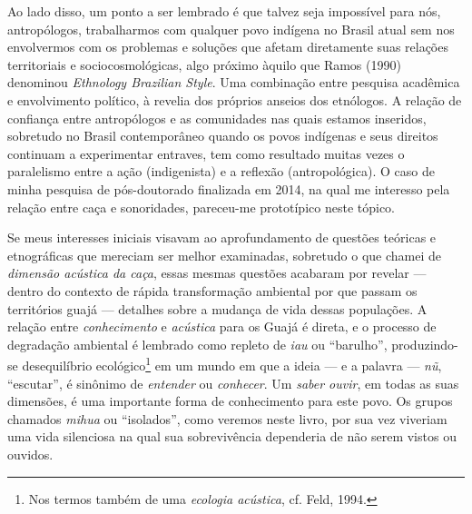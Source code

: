 Ao lado disso, um ponto a ser lembrado é que talvez seja impossível para
nós, antropólogos, trabalharmos com qualquer povo indígena no Brasil
atual sem nos envolvermos com os problemas e soluções que afetam
diretamente suas relações territoriais e sociocosmológicas, algo próximo
àquilo que Ramos (1990) denominou \textit{Ethnology Brazilian Style}.
Uma combinação entre pesquisa acadêmica e envolvimento político, à
revelia dos próprios anseios dos etnólogos. A relação de confiança entre
antropólogos e as comunidades nas quais estamos inseridos, sobretudo no
Brasil contemporâneo quando os povos indígenas e seus direitos continuam
a experimentar entraves, tem como resultado muitas vezes o paralelismo
entre a ação (indigenista) e a reflexão (antropológica). O caso de minha
pesquisa de pós-doutorado finalizada em 2014, na qual me interesso pela
relação entre caça e sonoridades, pareceu-me prototípico neste tópico.

Se meus interesses iniciais visavam ao aprofundamento de questões
teóricas e etnográficas que mereciam ser melhor examinadas, sobretudo
o que chamei de \textit{dimensão acústica da caça}, essas mesmas questões
acabaram por revelar --- dentro do contexto de rápida transformação
ambiental por que passam os territórios guajá --- detalhes sobre a
mudança de vida dessas populações. A relação entre \textit{conhecimento} e
\textit{acústica} para os Guajá é direta, e o processo de degradação ambiental
é lembrado como repleto de \textit{iau} ou ``barulho'', produzindo-se
desequilíbrio ecológico\footnote{Nos termos também de uma \textit{ecologia acústica},
cf. Feld, 1994.} em um mundo em que a ideia --- e a palavra --- \textit{nũ}, ``escutar'', é sinônimo de \textit{entender} ou \textit{conhecer}. Um \textit{saber
ouvir}, em todas as suas dimensões, é uma importante forma de
conhecimento para este povo. Os grupos chamados \textit{mihua} ou ``isolados'', como veremos neste livro, por sua vez viveriam uma vida
silenciosa na qual sua sobrevivência dependeria de não serem vistos ou
ouvidos.

